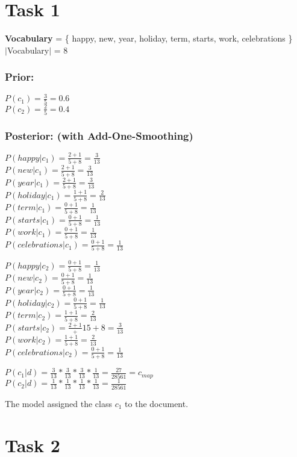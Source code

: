 \documentclass[a4paper]{scrartcl}
\begin{document}
    
\section*{Task 1}
\textbf{Vocabulary} = \{ happy, new, year, holiday, term, starts, work, celebrations \}\\
$|$Vocabulary$|$ = 8

\subsubsection*{Prior:}
    $P(c_1) = \frac{3}{5} = 0.6$\\
    $P(c_2) = \frac{2}{5} = 0.4$ 

\subsubsection*{Posterior: (with Add-One-Smoothing)}
\begin{multicols}{2}
    $P(happy|c_1) = \frac{2 + 1}{5 + 8} = \frac{3}{13}$\\
    $P(new|c_1) = \frac{2 + 1}{5 + 8} = \frac{3}{13}$\\
    $P(year|c_1) = \frac{2 + 1}{5 + 8} = \frac{3}{13}$\\
    $P(holiday|c_1) = \frac{1 + 1}{5 + 8} = \frac{2}{13}$\\
    $P(term|c_1) = \frac{0 + 1}{5 + 8} = \frac{1}{13}$\\
    $P(starts|c_1) = \frac{0 + 1}{5 + 8} = \frac{1}{13}$\\
    $P(work|c_1) = \frac{0 + 1}{5 + 8} = \frac{1}{13}$\\
    $P(celebrations|c_1) = \frac{0 + 1}{5 + 8} = \frac{1}{13}$

    $P(happy|c_2) = \frac{0 + 1}{5 + 8} = \frac{1}{13}$\\
    $P(new|c_2) = \frac{0 + 1}{5 + 8} = \frac{1}{13}$\\
    $P(year|c_2) = \frac{0 + 1}{5 + 8} = \frac{1}{13}$\\
    $P(holiday|c_2) = \frac{0 + 1}{5 + 8} = \frac{1}{13}$\\
    $P(term|c_2) = \frac{1 + 1}{5 + 8} = \frac{2}{13}$\\
    $P(starts|c_2) = \frac{2 + 1} + 1{5 + 8} = \frac{3}{13}$\\
    $P(work|c_2) = \frac{1 + 1}{5 + 8} = \frac{2}{13}$\\
    $P(celebrations|c_2) = \frac{0 + 1}{5 + 8} = \frac{1}{13}$
\end{multicols}

$P(c_1|d) = \frac{3}{13} * \frac{3}{13} * \frac{3}{13} * \frac{1}{13} = \frac{27}{28561} = c_{map}$\\
$P(c_2|d) = \frac{1}{13} * \frac{1}{13} * \frac{1}{13} * \frac{1}{13} = \frac{1}{28561}$

The model assigned the class $c_1$ to the document.




\section*{Task 2}
\end{document}
